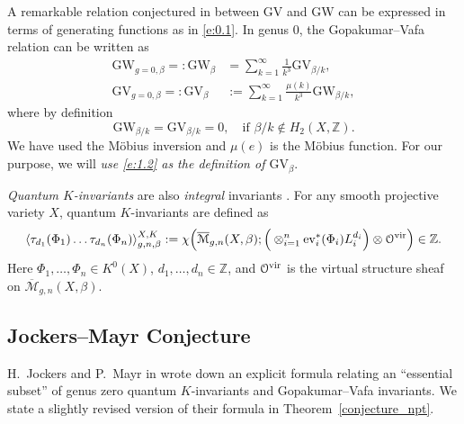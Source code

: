 \documentclass[11pt]{amsart}
\newtheorem*{main theorem*}{Main Theorem}
\theoremstyle{remark}
\numberwithin{equation}{section}
\newcommand{\M}{\overline{\mathcal{M}}}
\newcommand{\vir}{{\rm vir}}
\newcommand{\ev}{{\rm ev}}
\def\O{\mathcal{O}}
\newcommand{\GW}{{\mathrm{GW}}}
\newcommand{\GV}{{\mathrm{GV}}}
\begin{document}
A remarkable relation conjectured in \cite{Gopakumar_Vafa_1998} between GV and GW can be expressed in terms of generating functions as in \eqref{e:0.1}.
In genus 0, the Gopakumar--Vafa relation can be written as
\begin{equation} \label{e:1.2}
\begin{split}
    {\GW}_{g=0, \beta} =: {\GW}_{\beta} & = \sum_{k=1}^{\infty} \frac{1}{k^3} {\GV}_{\beta/k}, \\ 
    {\GV}_{g=0, \beta} =:     {\GV}_{\beta} & := \sum_{k=1}^{\infty} \frac{\mu(k)}{k^3} {\GW}_{\beta/k}, 
\end{split}
\end{equation}
where by definition
\[
\GW_{\beta/k} = \GV_{\beta/k}=0, \quad \text{if } \beta/k \notin H_2(X,\mathbb{Z}).
\]
We have used the M\"obius inversion and $\mu(e)$ is the M\"obius function. For our purpose, we will \emph{use \eqref{e:1.2} as the definition of ${\GV}_{\beta}$}. 



\emph{Quantum $K$-invariants} are also \emph{integral} invariants \cite{Givental_2000, Lee_2004}.
For any smooth projective variety $X$, quantum $K$-invariants are defined as
\[
\langle \tau_{d_1}(\Phi_1)\dots \tau_{d_n}(\Phi_n) \rangle^{X, {K}}_{g,n,\beta} :=  \chi \Big(  \M_{g,n}(X,\beta) ; \Big(  \otimes_{i=1}^n \ev_i^*(\Phi_i) L_i^{d_i}  \Big) \otimes \O^{\vir}  \Big) \in \mathbb{Z}.
\]
Here $\Phi_1,\dots,\Phi_n \in K^0(X)$, $d_1,\dots,d_n \in \mathbb{Z}$, and $\O^{\vir}$ is the virtual structure sheaf on $\M_{g,n}(X,\beta)$. %



\subsection{Jockers--Mayr Conjecture} \label{section_conjecture}
H.~Jockers and P.~Mayr in \cite{Jockers_Mayr_2019} wrote down an explicit formula relating an ``essential subset'' of genus zero quantum $K$-invariants and Gopakumar--Vafa invariants. We state a slightly revised version of their formula in Theorem~\ref{conjecture_npt}.
\end{document}
